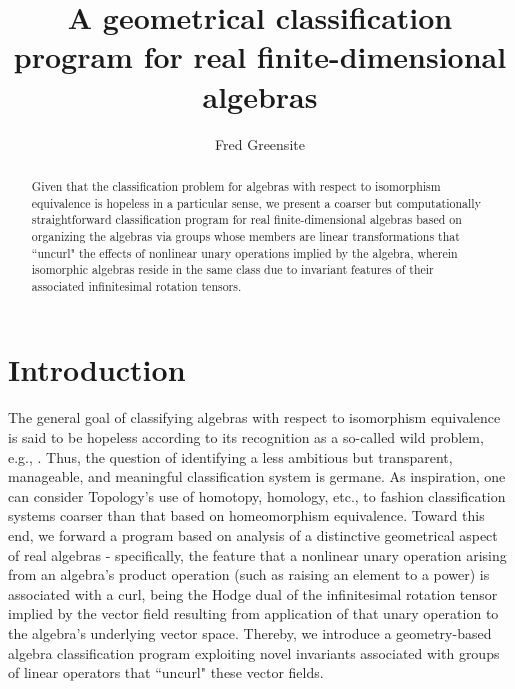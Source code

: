 \documentclass{amsart}
\numberwithin{equation}{section}
\theoremstyle{definition}
\numberwithin{theorem}{section}
\begin{document}
       
             \title{A geometrical classification program for real finite-dimensional algebras}
    \author{Fred Greensite}
    
   \begin{abstract}     Given that the classification problem for algebras with respect to isomorphism equivalence is hopeless in a particular sense, we present a coarser but computationally straightforward classification program for real finite-dimensional algebras based on organizing the algebras via groups whose members are linear transformations that ``uncurl" the effects of nonlinear unary operations implied by the algebra, wherein isomorphic algebras reside in the same class due to invariant features of their associated infinitesimal rotation tensors.     
   \end{abstract}
        
  \maketitle
  
 \tableofcontents
 
  \section{Introduction} The general goal of classifying algebras with respect to isomorphism equivalence is said to be hopeless according to its recognition as a so-called wild problem, e.g., \cite{drozd:1972,prest:1991,sergeichuk:2000,belitskii:2005}.   Thus, the question of identifying a less ambitious but transparent, manageable, and meaningful classification system is germane.  As inspiration, one can consider Topology's use of homotopy, homology, etc., to fashion classification systems coarser than that based on homeomorphism equivalence.  Toward this end, we forward a program based on analysis of a distinctive geometrical aspect of real algebras - specifically, the feature that a nonlinear unary operation arising from an algebra's product operation (such as raising an element to a power) is associated with a curl, being the Hodge dual of the infinitesimal rotation tensor implied by the vector field resulting from application of that unary operation to the algebra's underlying vector space.   Thereby, we introduce a geometry-based algebra classification program exploiting novel invariants associated with groups of linear operators that ``uncurl" these vector fields.  
     
\end{document}
